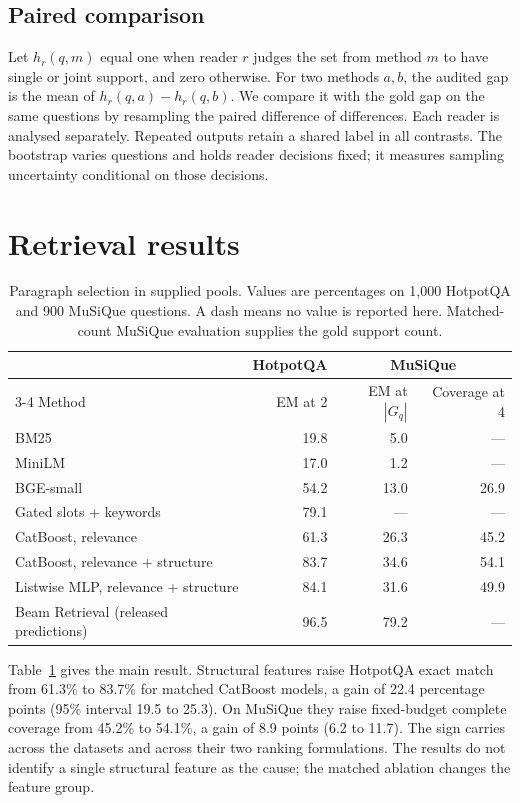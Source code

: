 \documentclass[twoside,a4paper,11pt]{article}
\begin{document}
\subsection{Paired comparison}
Let $h_r(q,m)$ equal one when reader $r$ judges the set from method $m$ to have single or joint support, and zero otherwise. For two methods $a,b$, the audited gap is the mean of $h_r(q,a)-h_r(q,b)$. We compare it with the gold gap on the same questions by resampling the paired difference of differences. Each reader is analysed separately. Repeated outputs retain a shared label in all contrasts. The bootstrap varies questions and holds reader decisions fixed; it measures sampling uncertainty conditional on those decisions.

\section{Retrieval results}
\begin{table}[t]
\centering\small
\begin{tabular}{lrrr}\toprule
& HotpotQA & \multicolumn{2}{c}{MuSiQue}\\
\cmidrule(lr){3-4}
Method & EM at 2 & EM at $|G_q|$ & Coverage at 4\\\midrule
BM25 &19.8&5.0&---\\
MiniLM &17.0&1.2&---\\
BGE-small &54.2&13.0&26.9\\
Gated slots + keywords &79.1&---&---\\
CatBoost, relevance &61.3&26.3&45.2\\
CatBoost, relevance + structure &83.7&34.6&54.1\\
Listwise MLP, relevance + structure &84.1&31.6&49.9\\
Beam Retrieval (released predictions) &96.5&79.2&---\\\bottomrule
\end{tabular}
\caption{Paragraph selection in supplied pools. Values are percentages on 1,000 HotpotQA and 900 MuSiQue questions. A dash means no value is reported here. Matched-count MuSiQue evaluation supplies the gold support count.}\label{tab:primary}
\end{table}
Table~\ref{tab:primary} gives the main result. Structural features raise HotpotQA exact match from 61.3\% to 83.7\% for matched CatBoost models, a gain of 22.4 percentage points (95\% interval 19.5 to 25.3). On MuSiQue they raise fixed-budget complete coverage from 45.2\% to 54.1\%, a gain of 8.9 points (6.2 to 11.7). The sign carries across the datasets and across their two ranking formulations. The results do not identify a single structural feature as the cause; the matched ablation changes the feature group.
\end{document}
